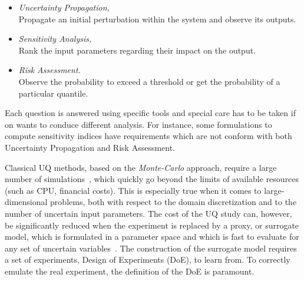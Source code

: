 \begin{itemize}
	\item \emph{Uncertainty Propagation,}\hfill\\
Propagate an initial perturbation within the system and observe its outputs.
	\item \emph{Sensitivity Analysis,}\hfill\\
Rank the input parameters regarding their impact on the output.
	\item \emph{Risk Assessment.}\hfill\\
Observe the probability to exceed a threshold or get the probability of a particular quantile.
\end{itemize}

Each question is answered using specific tools and special care has to be taken if on wants to conduce different analysis. For instance, some formulations to compute sensitivity indices have requirements which are not conform with both Uncertainty Propagation and Risk Assessment.

Classical UQ methods, based on the \emph{Monte-Carlo} approach, require a large number of simulations~\cite{Saltelli2007}, which quickly go beyond the limits of available resources (such as CPU, financial costs). This is especially true when it comes to large-dimensional problems, both with respect to the domain discretization and to the number of uncertain input parameters. The cost of the UQ study can, however, be significantly reduced when the experiment is replaced by a proxy, or surrogate model, which is formulated in a parameter space and which is fast to evaluate for any set of uncertain variables~\cite{martin2005}. The construction of the surrogate model requires a set of experiments, Design of Experiments (DoE), to learn from. To correctly emulate the real experiment, the definition of the DoE is paramount.\bigskip

%
%
%

